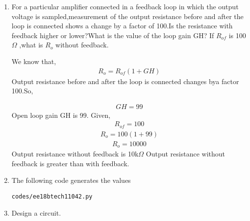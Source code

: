 \begin{enumerate}[label=\thesubsection.\arabic*.,ref=\thesubsection.\theenumi]


\item For a particular amplifier connected in a feedback loop in which the output voltage is sampled,measurement of the output resistance before and after the loop is connected shows a change by a factor of 100.Is the resistance with feedback higher or lower?What is the value of the loop gain GH? If $R_{of}$ is 100 $\Omega$ ,what is $R_o$ without feedback.

\solution
We know that,
\begin{align}
    R_o = R_{of}(1+GH)
    \label{eq:ee18btech11042_1}
\end{align}
Output resistance before and after the loop is connected changes bya factor 100.So,

\begin{align}
    GH =99
\end{align}
Open loop gain GH is  99.
\newline
Given,
\begin{align}
    R_{of} = 100 
    \label{eq:ee18btech11042_3}
\end{align}
\begin{align}
    R_o = 100(1+99)
    \label{eq:ee18btech11042_4}
\end{align}
\begin{align}
    R_o = 10000
    \label{eq:ee18btech11042_5}
\end{align}
Output resistance without feedback  is   10k$\Omega$
\newline
Output resistance without feedback is greater than with feedback.
\item
The following code generates the values
\begin{lstlisting}
codes/ee18btech11042.py
\end{lstlisting}

\item Design a circuit.
\solution



\end{enumerate}
